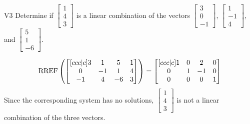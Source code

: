 \begin{problem}{V3} Determine if \(\begin{bmatrix} 1 \\ 4 \\ 3 \end{bmatrix}\) is a linear combination of the vectors \(\begin{bmatrix} 3 \\ 0 \\ -1 \end{bmatrix}\), \(\begin{bmatrix} 1 \\ -1 \\ 4 \end{bmatrix}\), and \(\begin{bmatrix} 5 \\ 1 \\  -6 \end{bmatrix}\).
\end{problem}
\begin{solution}
\[\operatorname{RREF}\left(\begin{bmatrix}[ccc|c] 3 & 1 & 5 & 1 \\ 0 & -1 & 1 & 4 \\ -1 & 4 & -6 & 3 \end{bmatrix} \right) = \begin{bmatrix}[ccc|c] 1 & 0 & 2 & 0 \\ 0 & 1 & -1 & 0 \\ 0 & 0 & 0 & 1 \end{bmatrix}\]
Since the corresponding system has no solutions, \(\begin{bmatrix} 1 \\ 4 \\ 3 \end{bmatrix}\) is not a linear combination of the three vectors.
\end{solution}


